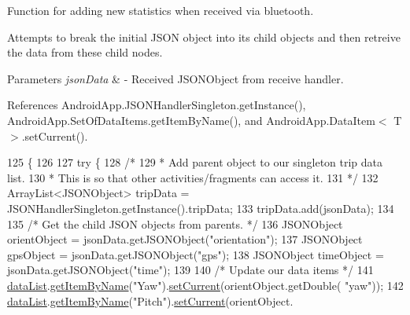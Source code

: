Function for adding new statistics when received via bluetooth. 

Attempts to break the initial J\+S\+ON object into it\textquotesingle{}s child objects and then retreive the data from these child nodes.


\begin{DoxyParams}{Parameters}
{\em json\+Data} & -\/ Received J\+S\+O\+N\+Object from receive handler. \\
\hline
\end{DoxyParams}


References Android\+App.\+J\+S\+O\+N\+Handler\+Singleton.\+get\+Instance(), Android\+App.\+Set\+Of\+Data\+Items.\+get\+Item\+By\+Name(), and Android\+App.\+Data\+Item$<$ T $>$.\+set\+Current().


\begin{DoxyCode}
125                                                     \{
126 
127         \textcolor{keywordflow}{try} \{
128             \textcolor{comment}{/*}
129 \textcolor{comment}{             * Add parent object to our singleton trip data list.}
130 \textcolor{comment}{             * This is so that other activities/fragments can access it.}
131 \textcolor{comment}{             */}
132             ArrayList<JSONObject> tripData = JSONHandlerSingleton.getInstance().tripData;
133             tripData.add(jsonData);
134 
135             \textcolor{comment}{/* Get the child JSON objects from parents. */}
136             JSONObject orientObject = jsonData.getJSONObject(\textcolor{stringliteral}{"orientation"});
137             JSONObject gpsObject = jsonData.getJSONObject(\textcolor{stringliteral}{"gps"});
138             JSONObject timeObject = jsonData.getJSONObject(\textcolor{stringliteral}{"time"});
139 
140             \textcolor{comment}{/* Update our data items */}
141             \hyperlink{class_android_app_1_1_realtime_fragment_ab1c4983b61e50b501ed22842253bf849}{dataList}.\hyperlink{class_android_app_1_1_set_of_data_items_aa559ef3701bb9f59f124ddddc56a2a38}{getItemByName}(\textcolor{stringliteral}{"Yaw"}).\hyperlink{class_android_app_1_1_data_item_a6cd8975067d5be2d5eaac137a94c0eac}{setCurrent}(orientObject.getDouble(\textcolor{stringliteral}{
      "yaw"}));
142             \hyperlink{class_android_app_1_1_realtime_fragment_ab1c4983b61e50b501ed22842253bf849}{dataList}.\hyperlink{class_android_app_1_1_set_of_data_items_aa559ef3701bb9f59f124ddddc56a2a38}{getItemByName}(\textcolor{stringliteral}{"Pitch"}).\hyperlink{class_android_app_1_1_data_item_a6cd8975067d5be2d5eaac137a94c0eac}{setCurrent}(orientObject.

\end{DoxyCode}
